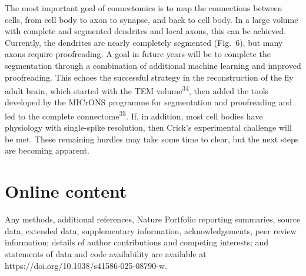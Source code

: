 \documentclass{article}
\begin{document}
The most important goal of connectomics is to map the connections between cells, from cell body to axon to synapse, and back to cell body. In a large volume with complete and segmented dendrites and local axons, this can be achieved. Currently, the dendrites are nearly completely segmented (Fig.~6), but many axons require proofreading. A goal in future years will be to complete the segmentation through a combination of additional machine learning and improved proofreading. This echoes the successful strategy in the reconstruction of the fly adult brain, which started with the TEM volume\textsuperscript{34}, then added the tools developed by the MICrONS programme for segmentation and proofreading and led to the complete connectome\textsuperscript{35}. If, in addition, most cell bodies have physiology with single-spike resolution, then Crick’s experimental challenge will be met. These remaining hurdles may take some time to clear, but the next steps are becoming apparent.

\section*{Online content}

Any methods, additional references, Nature Portfolio reporting summaries, source data, extended data, supplementary information, acknowledgements, peer review information; details of author contributions and competing interests; and statements of data and code availability are available at https://doi.org/10.1038/s41586-025-08790-w.
\end{document}
